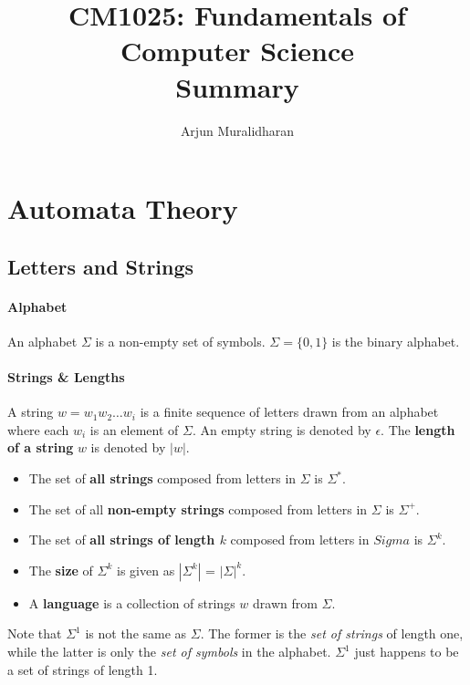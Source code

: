 
\title{CM1025: Fundamentals of Computer Science \\ Summary}
\author{Arjun Muralidharan}








\section{Automata Theory}
\subsection{Letters and Strings}
\paragraph{Alphabet} An alphabet \( \Sigma \)  is a non-empty set of symbols. \( \Sigma = \{ 0,1 \} \) is the binary alphabet.
\paragraph{Strings \& Lengths} A string \( w = w_1 w_2 \ldots w_i\) is a finite sequence of letters drawn from an alphabet where each \( w_i \) is an element of \( \Sigma \). An empty string is denoted by \( \epsilon \). The \textbf{length of a string} \( w \) is denoted by \( |w| \). 

\begin{itemize}
	\item The set of \textbf{all strings} composed from letters in \( \Sigma \) is \( \Sigma^* \).
	\item The set of all \textbf{non-empty strings} composed from letters in \( \Sigma \) is \( \Sigma^+ \).
	\item The set of \textbf{all strings of length \( k \) }composed from letters in \( Sigma \) is \( \Sigma^k \).
	\item The \textbf{size} of \( \Sigma^k \) is given as \( |\Sigma^k| \) = \( |\Sigma|^k \).
	\item A \textbf{language} is a collection of strings \( w \) drawn from \( \Sigma \).
\end{itemize}
Note that \( \Sigma^1 \) is not the same as \( \Sigma \). The former is the \emph{set of strings} of length one, while the latter is only the \emph{set of symbols} in the alphabet. \( \Sigma^1 \) just happens to be a set of strings of length 1.

